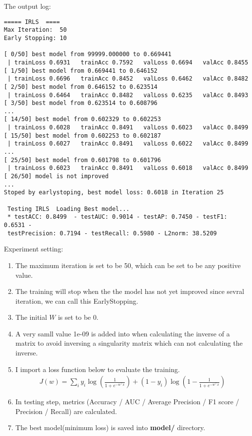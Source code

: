 \documentclass[a4paper]{article}
\begin{document}
The output log:
\begin{verbatim}
===== IRLS  ====
Max Iteration:  50
Early Stopping: 10

[ 0/50] best model from 99999.000000 to 0.669441 
 | trainLoss 0.6931   trainAcc 0.7592   valLoss 0.6694   valAcc 0.8455
[ 1/50] best model from 0.669441 to 0.646152 
 | trainLoss 0.6696   trainAcc 0.8452   valLoss 0.6462   valAcc 0.8482
[ 2/50] best model from 0.646152 to 0.623514 
 | trainLoss 0.6464   trainAcc 0.8482   valLoss 0.6235   valAcc 0.8493
[ 3/50] best model from 0.623514 to 0.608796 
...
[ 14/50] best model from 0.602329 to 0.602253 
 | trainLoss 0.6028   trainAcc 0.8491   valLoss 0.6023   valAcc 0.8499
[ 15/50] best model from 0.602253 to 0.602187 
 | trainLoss 0.6027   trainAcc 0.8491   valLoss 0.6022   valAcc 0.8499
...
[ 25/50] best model from 0.601798 to 0.601796 
 | trainLoss 0.6023   trainAcc 0.8491   valLoss 0.6018   valAcc 0.8499
[ 26/50] model is not improved
...
Stoped by earlystoping, best model loss: 0.6018 in Iteration 25 

 Testing IRLS  Loading Best model...
 * testACC: 0.8499  - testAUC: 0.9014 - testAP: 0.7450 - testF1: 0.6531 - 
 testPrecision: 0.7194 - testRecall: 0.5980 - L2norm: 38.5209
\end{verbatim}

$\qquad$\\

Experiment setting:\\

\begin{enumerate}[1.]
\item The maximum iteration is set to be 50, which can be set to be any positive value.
\item The training will stop when the the model has not yet improved since sevral iteration, we can call this EarlyStopping.
\item The initial $W$ is set to be 0.
\item A very samll value 1e-09 is added into when calculating the inverse of a matrix to avoid inversing a singularity matrix which can not calculating the inverse.
\item I import a loss function below to evaluate the training.
      \begin{equation}
          \begin{aligned}
          J(w) = \sum_{i} {y_i \log{(\frac{1}{1+e^{-w^{\top}x}})} +(1-y_i) \log{(1-\frac{1}{1+e^{-w^{\top}x}})}} 
          \end{aligned}
      \end{equation}
\item In testing step, metrics (Accuracy / AUC / Average Precision / F1 score / Precision / Recall) are calculated.
\item The best model(minimum loss) is saved into \textbf{model/} directory.
\end{enumerate}
\end{document}
